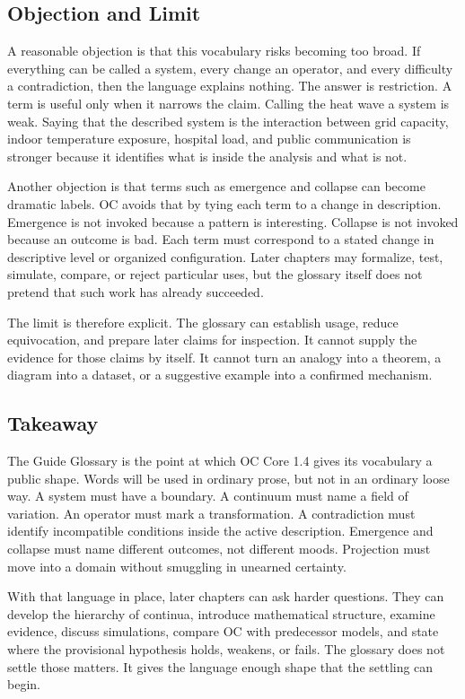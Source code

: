\documentclass[11pt,a4paper,openany]{book}
\begin{document}
\subsection{Objection and Limit}
A reasonable objection is that this vocabulary risks becoming too broad. If everything can be called a system, every change an operator, and every difficulty a contradiction, then the language explains nothing. The answer is restriction. A term is useful only when it narrows the claim. Calling the heat wave a system is weak. Saying that the described system is the interaction between grid capacity, indoor temperature exposure, hospital load, and public communication is stronger because it identifies what is inside the analysis and what is not. \cite{raf_networks,bak_soc}\par
Another objection is that terms such as emergence and collapse can become dramatic labels. OC avoids that by tying each term to a change in description. Emergence is not invoked because a pattern is interesting. Collapse is not invoked because an outcome is bad. Each term must correspond to a stated change in descriptive level or organized configuration. Later chapters may formalize, test, simulate, compare, or reject particular uses, but the glossary itself does not pretend that such work has already succeeded.\par
The limit is therefore explicit. The glossary can establish usage, reduce equivocation, and prepare later claims for inspection. It cannot supply the evidence for those claims by itself. It cannot turn an analogy into a theorem, a diagram into a dataset, or a suggestive example into a confirmed mechanism.\par
\subsection{Takeaway}
The Guide Glossary is the point at which OC Core 1.4 gives its vocabulary a public shape. Words will be used in ordinary prose, but not in an ordinary loose way. A system must have a boundary. A continuum must name a field of variation. An operator must mark a transformation. A contradiction must identify incompatible conditions inside the active description. Emergence and collapse must name different outcomes, not different moods. Projection must move into a domain without smuggling in unearned certainty. \cite{raf_networks,bak_soc}\par
With that language in place, later chapters can ask harder questions. They can develop the hierarchy of continua, introduce mathematical structure, examine evidence, discuss simulations, compare OC with predecessor models, and state where the provisional hypothesis holds, weakens, or fails. The glossary does not settle those matters. It gives the language enough shape that the settling can begin.\par
\clearpage
\nocite{*}
\printbibliography[heading=bibintoc,title={Bibliography}]
\end{document}
